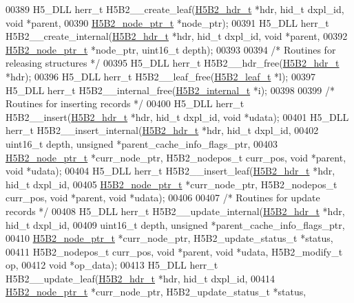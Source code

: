 \begin{DoxyCode}
{{00389 H5\_DLL herr\_t H5B2\_\_create\_leaf(\hyperlink{struct_h5_b2__hdr__t}{H5B2\_hdr\_t} *hdr, hid\_t dxpl\_id, \textcolor{keywordtype}{void} *parent,
00390     \hyperlink{struct_h5_b2__node__ptr__t}{H5B2\_node\_ptr\_t} *node\_ptr);
00391 H5\_DLL herr\_t H5B2\_\_create\_internal(\hyperlink{struct_h5_b2__hdr__t}{H5B2\_hdr\_t} *hdr, hid\_t dxpl\_id, \textcolor{keywordtype}{void} *parent,
00392     \hyperlink{struct_h5_b2__node__ptr__t}{H5B2\_node\_ptr\_t} *node\_ptr, uint16\_t depth);
00393 
00394 \textcolor{comment}{/* Routines for releasing structures */}
00395 H5\_DLL herr\_t H5B2\_\_hdr\_free(\hyperlink{struct_h5_b2__hdr__t}{H5B2\_hdr\_t} *hdr);
00396 H5\_DLL herr\_t H5B2\_\_leaf\_free(\hyperlink{struct_h5_b2__leaf__t}{H5B2\_leaf\_t} *l);
00397 H5\_DLL herr\_t H5B2\_\_internal\_free(\hyperlink{struct_h5_b2__internal__t}{H5B2\_internal\_t} *i);
00398 
00399 \textcolor{comment}{/* Routines for inserting records */}
00400 H5\_DLL herr\_t H5B2\_\_insert(\hyperlink{struct_h5_b2__hdr__t}{H5B2\_hdr\_t} *hdr, hid\_t dxpl\_id, \textcolor{keywordtype}{void} *udata);
00401 H5\_DLL herr\_t H5B2\_\_insert\_internal(\hyperlink{struct_h5_b2__hdr__t}{H5B2\_hdr\_t} *hdr, hid\_t dxpl\_id,
00402     uint16\_t depth, \textcolor{keywordtype}{unsigned} *parent\_cache\_info\_flags\_ptr,
00403     \hyperlink{struct_h5_b2__node__ptr__t}{H5B2\_node\_ptr\_t} *curr\_node\_ptr, H5B2\_nodepos\_t curr\_pos, \textcolor{keywordtype}{void} *parent, \textcolor{keywordtype}{void} *udata);
00404 H5\_DLL herr\_t H5B2\_\_insert\_leaf(\hyperlink{struct_h5_b2__hdr__t}{H5B2\_hdr\_t} *hdr, hid\_t dxpl\_id,
00405     \hyperlink{struct_h5_b2__node__ptr__t}{H5B2\_node\_ptr\_t} *curr\_node\_ptr, H5B2\_nodepos\_t curr\_pos, \textcolor{keywordtype}{void} *parent, \textcolor{keywordtype}{void} *udata);
00406 
00407 \textcolor{comment}{/* Routines for update records */}
00408 H5\_DLL herr\_t H5B2\_\_update\_internal(\hyperlink{struct_h5_b2__hdr__t}{H5B2\_hdr\_t} *hdr, hid\_t dxpl\_id,
00409     uint16\_t depth, \textcolor{keywordtype}{unsigned} *parent\_cache\_info\_flags\_ptr,
00410     \hyperlink{struct_h5_b2__node__ptr__t}{H5B2\_node\_ptr\_t} *curr\_node\_ptr, H5B2\_update\_status\_t *status,
00411     H5B2\_nodepos\_t curr\_pos, \textcolor{keywordtype}{void} *parent, \textcolor{keywordtype}{void} *udata, H5B2\_modify\_t op,
00412     \textcolor{keywordtype}{void} *op\_data);
00413 H5\_DLL herr\_t H5B2\_\_update\_leaf(\hyperlink{struct_h5_b2__hdr__t}{H5B2\_hdr\_t} *hdr, hid\_t dxpl\_id,
00414     \hyperlink{struct_h5_b2__node__ptr__t}{H5B2\_node\_ptr\_t} *curr\_node\_ptr, H5B2\_update\_status\_t *status,
}}
\end{DoxyCode}
